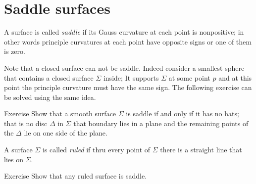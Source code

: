 \chapter{Saddle surfaces}

A surface is called \emph{saddle} if its Gauss curvature at each point is nonpositive;
in other words principle curvatures at each point have opposite signs or one of them is zero.

Note that a closed surface can not be saddle.
Indeed consider a smallest sphere that contains a closed surface $\Sigma$ inside;
It supports $\Sigma$ at some point $p$ and at this point the principle curvature must have the same sign.
The following exercise can be solved using the same idea.

\begin{thm}{Exercise}
Show that a smooth surface $\Sigma$ is saddle if and only if it has no hats;
that is no disc $\Delta$ in $\Sigma$ that boundary lies in a plane and the remaining points of the $\Delta$ lie on one side of the plane.  
\end{thm}

A surface $\Sigma$ is called \emph{ruled} if thru every point of $\Sigma$ there is a straight line that lies on $\Sigma$.

\begin{thm}{Exercise}
Show that any ruled surface is saddle.
\end{thm}

